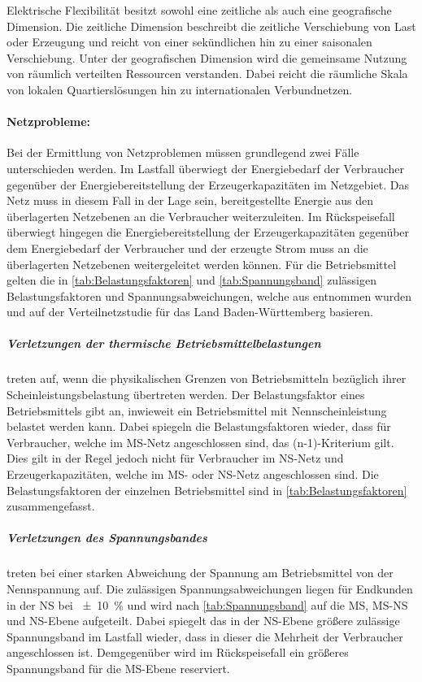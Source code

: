 Elektrische Flexibilität besitzt sowohl eine zeitliche als auch eine geografische Dimension.
Die zeitliche Dimension beschreibt die zeitliche Verschiebung von Last oder Erzeugung und reicht von einer sekündlichen hin zu einer saisonalen Verschiebung.
Unter der geografischen Dimension wird die gemeinsame Nutzung von räumlich verteilten Ressourcen verstanden.
Dabei reicht die räumliche Skala von lokalen Quartierslösungen hin zu internationalen Verbundnetzen. \cite{BNetzA2017} \cite{IEA2014}


\paragraph{Netzprobleme:}

Bei der Ermittlung von Netzproblemen müssen grundlegend zwei Fälle unterschieden werden.
Im Lastfall überwiegt der Energiebedarf der Verbraucher gegenüber der Energiebereitstellung der Erzeugerkapazitäten im Netzgebiet.
Das Netz muss in diesem Fall in der Lage sein, bereitgestellte Energie aus den überlagerten Netzebenen an die Verbraucher weiterzuleiten.
Im Rückspeisefall überwiegt hingegen die Energiebereitstellung der Erzeugerkapazitäten gegenüber dem Energiebedarf der Verbraucher und der erzeugte Strom muss an die überlagerten Netzebenen weitergeleitet werden können. \cite{Agora2019}
Für die Betriebsmittel gelten die in \autoref{tab:Belastungsfaktoren} und \autoref{tab:Spannungsband} zulässigen Belastungsfaktoren und Spannungsabweichungen, welche aus \cite{Mueller2019a} entnommen wurden und auf der Verteilnetzstudie für das Land Baden-Württemberg \cite{Rehtanz2017} basieren.

\subparagraph{Verletzungen der thermische Betriebsmittelbelastungen} treten auf, wenn die physikalischen Grenzen von Betriebsmitteln bezüglich ihrer Scheinleistungsbelastung übertreten werden.
Der Belastungsfaktor eines Betriebsmittels gibt an, inwieweit ein Betriebsmittel mit Nennscheinleistung belastet werden kann.
Dabei spiegeln die Belastungsfaktoren wieder, dass für Verbraucher, welche im \gls{MS}-Netz angeschlossen sind, das (n-1)-Kriterium  gilt.
Dies gilt in der Regel jedoch nicht für Verbraucher im \gls{NS}-Netz und Erzeugerkapazitäten, welche im \gls{MS}- oder \gls{NS}-Netz angeschlossen sind.
Die Belastungsfaktoren der einzelnen Betriebsmittel sind in \autoref{tab:Belastungsfaktoren} zusammengefasst. \cite{Schachler} \cite{Rehtanz2017}




\subparagraph{Verletzungen des Spannungsbandes} treten bei einer starken Abweichung der Spannung am Betriebsmittel von der Nennspannung auf.
Die zulässigen Spannungsabweichungen liegen für Endkunden in der \gls{NS} bei \SI{\pm 10}{\percent} und wird nach \autoref{tab:Spannungsband} auf die \gls{MS}, \gls{MS}-\gls{NS} und \gls{NS}-Ebene aufgeteilt.
Dabei spiegelt das in der \gls{NS}-Ebene größere zulässige Spannungsband im Lastfall wieder, dass in dieser die Mehrheit der Verbraucher angeschlossen ist.
Demgegenüber wird im Rückspeisefall ein größeres Spannungsband für die \gls{MS}-Ebene reserviert. \cite{Schachler} \cite{Rehtanz2017}

